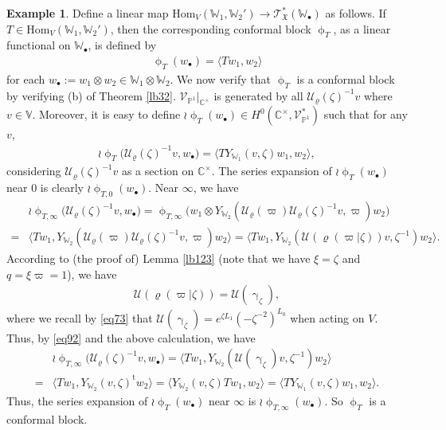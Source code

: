 \documentclass[12pt,a4paper,notitlepage]{report}
\theoremstyle{definition}
\newtheorem{eg}[df]{Example}
\theoremstyle{plain}
\newcommand{\fk}{\mathfrak}
\newcommand{\mc}{\mathcal}
\newcommand{\tr}{\mathrm{t}} %
\newcommand{\Hom}{\mathrm{Hom}}
\newcommand{\bk}[1]{\langle {#1}\rangle}
\newcommand{\scr}{\mathscr}
\newcommand{\blt}{\bullet}
\newcommand{\Vbb}{\mathbb V}
\newcommand{\Wbb}{\mathbb W}
\newcommand{\Cbb}{\mathbb C}
\newcommand{\Pbb}{\mathbb P}
\numberwithin{equation}{section}
\begin{document}
\begin{eg}
Define a linear map $\Hom_V(\Wbb_1,\Wbb_2')\rightarrow\scr T_{\fk X}^*(\Wbb_\blt)$ as follows. If $T\in \Hom_V(\Wbb_1,\Wbb_2')$, then the corresponding conformal block $\upphi_T$, as a linear functional on $\Wbb_\blt$, is defined by
\begin{align}
\upphi_T(w_\blt)=\bk{Tw_1,w_2}
\end{align}
for each $w_\blt:=w_1\otimes w_2\in \Wbb_1\otimes \Wbb_2$. We now verify that $\upphi_T$ is a conformal block by verifying (b) of Theorem \ref{lb32}. $\scr V_{\Pbb^1}|_{\Cbb^\times}$ is  generated by all $\mc U_\varrho(\zeta)^{-1}v$ where $v\in\Vbb$. Moreover, it is easy to define $\wr\upphi_T(w_\blt)\in H^0(\Cbb^\times,\scr V_{\Pbb^1}^*)$ such that for any $v$,
\begin{align*}
\wr\upphi_T\big(\mc U_\varrho(\zeta)^{-1}v,w_\blt\big)=\bk{TY_{\Wbb_1}(v,\zeta)w_1,w_2},
\end{align*}
considering $\mc U_\varrho(\zeta)^{-1}v$ as a section on $\Cbb^\times$. The series expansion of $\wr\upphi_T(w_\blt)$ near $0$ is clearly $\wr\upphi_{T,0}(w_\blt)$. Near $\infty$, we have
\begin{align*}
&\wr\upphi_{T,\infty}\big(\mc U_\varrho(\zeta)^{-1}v,w_\blt\big)=\upphi_{T,\infty}\big(w_1\otimes Y_{\Wbb_2}(\mc U_\varrho(\varpi)\mc U_\varrho(\zeta)^{-1}v,\varpi) w_2\big)\\
=&\bk{Tw_1,Y_{\Wbb_2}(\mc U_\varrho(\varpi)\mc U_\varrho(\zeta)^{-1}v,\varpi) w_2}=\bk{Tw_1,Y_{\Wbb_2}(\mc U(\varrho(\varpi|\zeta))v,\zeta^{-1}) w_2}.
\end{align*}
According to (the proof of) Lemma \ref{lb123} (note that we have $\xi=\zeta$ and $q=\xi\varpi=1$), we have
\begin{align*}
\mc U(\varrho(\varpi|\zeta))=\mc U(\upgamma_\zeta),
\end{align*}
where we recall by \eqref{eq73} that $\mc U(\upgamma_\zeta)=e^{\zeta L_1}(-\zeta^{-2})^{L_0}$ when acting on $V$. Thus, by \eqref{eq92} and the above calculation, we have
\begin{align*}
&\wr\upphi_{T,\infty}\big(\mc U_\varrho(\zeta)^{-1}v,w_\blt\big)=\bk{Tw_1,Y_{\Wbb_2}(\mc U(\upgamma_\zeta)v,\zeta^{-1}) w_2}\\
=&\bk{Tw_1,Y_{\Wbb_2}(v,\zeta)^\tr w_2}=\bk{Y_{\Wbb_2}(v,\zeta)Tw_1, w_2}=\bk{TY_{\Wbb_1}(v,\zeta)w_1,w_2}.
\end{align*}
Thus, the series expansion of $\wr\upphi_T(w_\blt)$ near $\infty$ is $\wr\upphi_{T,\infty}(w_\blt)$. So $\upphi_T$ is a conformal block.


\end{eg}
\end{document}
